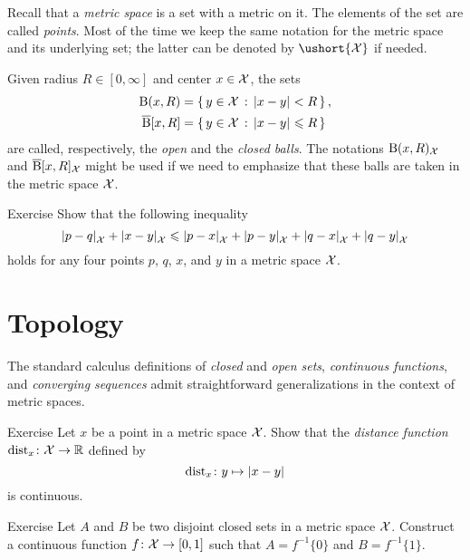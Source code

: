 Recall that a \emph{metric space} is a set with a metric on it.
The elements of the set are called \emph{points}. 
Most of the time we keep the same notation for the metric space and its underlying set;
the latter can be denoted by $\ushort{\spc{X}}$ if needed.

Given radius $R\in[0,\infty]$ and center $x\in \mathcal{X}$, the sets
\begin{align*}
\oBall(x,R)&=\set{y\in \spc{X}}{\dist{x}{y}{}<R},
\\
\cBall[x,R]&=\set{y\in \spc{X}}{\dist{x}{y}{}\le R}
\end{align*}
are called, respectively, the  \emph{open} and  the \emph{closed  balls}.
The notations $\mathrm{B}{}(x,R)_{\mathcal{X}}$ and $\overline{\mathrm{B}}{}[x,R]_{\mathcal{X}}$
might be used if we need to emphasize that these balls are taken in the metric space $\mathcal{X}$.


\begin{thm}{Exercise}\label{ex:quad-inq}
Show that the following inequality
\[\dist{p}{q}{\spc{X}}+\dist{x}{y}{\spc{X}}\le\dist{p}{x}{\spc{X}}+\dist{p}{y}{\spc{X}}+\dist{q}{x}{\spc{X}}+\dist{q}{y}{\spc{X}}\]
holds for any four points $p$, $q$, $x$, and $y$ in a metric space $\mathcal{X}$.
\end{thm}

\section{Topology}

The standard calculus definitions of \emph{closed} and \emph{open sets}, \emph{continuous functions}, and \emph{converging sequences} admit straightforward generalizations in the context of metric spaces.

\begin{thm}{Exercise}\label{ex:cont-dist}
Let $x$ be a point in a metric space $\mathcal{X}$.
Show that the \emph{distance function} $\mathrm{dist}_x\colon\mathcal{X}\to \mathbb{R}$ defined by
\[\distfun_x\:y\mapsto \dist{x}{y}{}\]
is continuous.
\end{thm}


\begin{thm}{Exercise}\label{ex:normal}
Let $A$ and $B$ be two disjoint closed sets in a metric space $\mathcal{X}$.
Construct a continuous function $f\colon\mathcal{X}\to [0,1]$ such that $A=f^{-1}\{0\}$ and $B=f^{-1}\{1\}$.
\end{thm}

